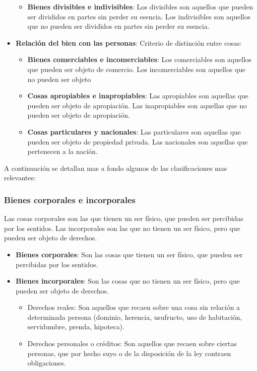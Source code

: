 \documentclass{templateNote}
\begin{document}
\begin{itemize}
\begin{itemize}
        \item \textbf{Bienes divisibles e indivisibles}: Los divisibles son aquellos que pueden ser divididos en partes sin perder su esencia. Los indivisibles son aquellos que no pueden ser divididos en partes sin perder su esencia.
    \end{itemize}
    \item \textbf{Relación del bien con las personas}: Criterio de distinción entre cosas:
    \begin{itemize}
        \item \textbf{Bienes comerciables e incomerciables}: Los comerciables son aquellos que pueden ser objeto de comercio. Los incomerciables son aquellos que no pueden ser objeto
        \item \textbf{Cosas apropiables e inapropiables}: Las apropiables son aquellas que pueden ser objeto de apropiación. Las inapropiables son aquellas que no pueden ser objeto de apropiación.
        \item \textbf{Cosas particulares y nacionales}: Las particulares son aquellas que pueden ser objeto de propiedad privada. Las nacionales son aquellas que pertenecen a la nación.
    \end{itemize}
\end{itemize}

\noindent A continuación se detallan mas a fondo algunos de las clasificaciones mas relevantes:

\subsubsection*{Bienes corporales e incorporales}
Las cosas corporales son las que tienen un ser físico, que pueden ser percibidas por los sentidos. Las incorporales son las que no tienen un ser físico, pero que pueden ser objeto de derechos.
\begin{itemize}
    \item \textbf{Bienes corporales}: Son las cosas que tienen un ser físico, que pueden ser percibidas por los sentidos.
    \item \textbf{Bienes incorporales}: Son las cosas que no tienen un ser físico, pero que pueden ser objeto de derechos.
    \begin{itemize}
        \item Derechos reales: Son aquellos que recaen sobre una cosa sin relación a determinada persona (dominio, herencia, usufructo, uso de habitación, servidumbre, prenda, hipoteca).
        \item Derechos personales o créditos: Son aquellos que recaen sobre ciertas personas, que por hecho suyo o de la disposición de la ley contraen obligaciones.
    \end{itemize}
\end{itemize}
\end{document}
